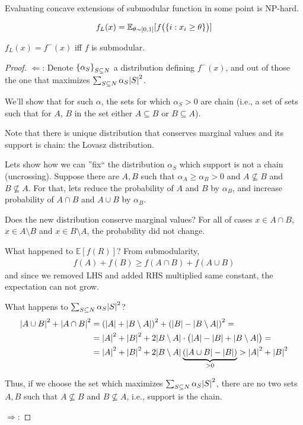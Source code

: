 \begin{prop}
	Evaluating concave extensions of submodular function in some point is NP-hard.
\end{prop}

\begin{definition}
	\begin{align}
	f_L(x) = \mathbb{E}_{\theta \sim [0,1]} [f\qty\big(\qty{i: x_i \geq \theta})]
	\end{align}
\end{definition}

\begin{theorem}[Lovasz]
	$f_L(x) = f^-(x)$ iff $f$ is submodular.
	\begin{proof}
		$\Leftarrow$:
		Denote $\qty{ \alpha_S}_{S\subseteq N}$ a distribution defining $f^-(x)$, and out of those the one that maximizes $\sum_{S \subseteq N} \alpha_S \abs{S}^2$.
		
		We'll show that for such $\alpha$, the sets for which $\alpha_S >0$ are chain (i.e., a set of sets such that for $A$, $B$ in the set either $A\subseteq B$ or $B\subseteq A$).
		
		Note that there is unique distribution that conserves marginal values and its support is chain: the Lovasz distribution. 
		
		Lets show how we can ''fix`` the distribution $\alpha_S$ which support is not a chain (uncrossing). Suppose there are $A,B$ such that $\alpha_A\geq \alpha_B >0$ and $A\not\subseteq B$ and  $B\not\subseteq A$.
		For that, lets reduce the probability of $A$ and $B$ by $\alpha_B$, and increase probability of $A\cap B$ and $A\cup B$ by $\alpha_B$.
		
		Does the new distribution conserve marginal values? For all of cases $x\in A\cap B$, $x\in A\setminus B$ and $x\in B\setminus A$, the probability did not change.
		
		What happened to $\mathbb{E} [f(R)]$? From submodularity,
		\begin{align}
		f(A) + f(B) \geq f(A\cap B) + f(A\cup B)
		\end{align}
		and since we removed LHS and added RHS multiplied same constant, the expectation can not grow.
		
		What happens to $\sum_{S \subseteq N} \alpha_S \abs{S}^2$?
		\begin{align}
		\abs{A\cup B}^2 + \abs{A\cap B}^2 &= \qty(\abs{A} + \abs{B\setminus A})^2 + \qty(\abs{B} - \abs{B\setminus A})^2 =\\&= \abs{A}^2+\abs{B}^2 + 2\abs{B\setminus A} \cdot \qty\big(\abs{A} - \abs{B} + \abs{B\setminus A}) =\\&= \abs{A}^2+\abs{B}^2 + 2\abs{B\setminus A}\underbrace{ \qty(\abs{A\cup B} - \abs{B})}_{>0} >  \abs{A}^2+\abs{B}^2
		\end{align}
		
		Thus, if we choose the set which maximizes $\sum_{S \subseteq N} \alpha_S \abs{S}^2$, there are no two sets $A,B$ such that $A\not\subseteq B$ and $B \not\subseteq A$, i.e., support is the chain.
		
		
		
		$\Rightarrow$:
	\end{proof}
\end{theorem}


